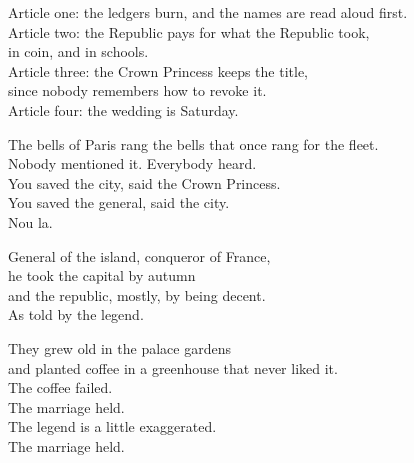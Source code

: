\begin{lyrics}
Article one: the ledgers burn, and the names are read aloud first.\\
Article two: the Republic pays for what the Republic took,\\
in coin, and in schools.\\
Article three: the Crown Princess keeps the title,\\
since nobody remembers how to revoke it.\\
Article four: the wedding is Saturday.

The bells of Paris rang the bells that once rang for the fleet.\\
Nobody mentioned it. Everybody heard.\\
You saved the city, said the Crown Princess.\\
You saved the general, said the city.\\
Nou la.

General of the island, conqueror of France,\\
he took the capital by autumn\\
and the republic, mostly, by being decent.\\
As told by the legend.

They grew old in the palace gardens\\
and planted coffee in a greenhouse that never liked it.\\
The coffee failed.\\
The marriage held.\\
The legend is a little exaggerated.\\
The marriage held.
\end{lyrics}

